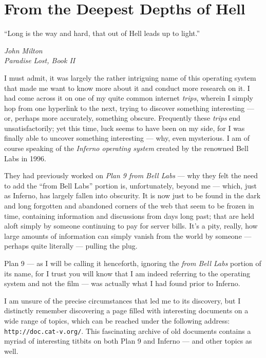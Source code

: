 \documentclass[a5paper,twoside,12pt]{report}
\begin{document}
\chapter*{From the Deepest Depths of Hell}

\epigraph{``Long is the way and hard, that out of Hell leads up to light.''}{\textit{John Milton\\Paradise Lost, Book II}}

I must admit, it was largely the rather intriguing name of this operating system that made me want to know more about it and conduct more research on it. I had come across it on one of my quite common internet \textit{trips}, wherein I simply hop from one hyperlink to the next, trying to discover something interesting — or, perhaps more accurately, something obscure. 
Frequently these \textit{trips} end unsatisfactorily; yet this time, luck seems to have been on my side, for I was finally able to uncover something interesting — why, even mysterious. I am of course speaking of the \textit{Inferno operating system} created by the renowned Bell Labs in 1996. 

They had previously worked on \textit{Plan 9 from Bell Labs} — why they felt the need to add the ``from Bell Labs'' portion is, unfortunately, beyond me — which, just as Inferno, has largely fallen into obscurity. It is now just to be found in the dark and long forgotten and abandoned corners of the web that seem to be frozen in time, containing information and discussions from days long past; that are held aloft simply by someone continuing to pay for server bills. It's a pity, really, how large amounts of information can simply vanish from the world by someone — perhaps quite literally — pulling the plug.

Plan 9 — as I will be calling it henceforth, ignoring the \textit{from Bell Labs} portion of its name, for I trust you will know that I am indeed referring to the operating system and not the film — was actually what I had found prior to Inferno.

I am unsure of the precise circumstances that led me to its discovery, but I distinctly remember discovering a page filled with interesting documents on a wide range of topics, which can be reached under the following address: \texttt{http://doc.cat-v.org/}. 
This fascinating archive of old documents contains a myriad of interesting titbits on both Plan 9 and Inferno — and other topics as well. 
\end{document}
